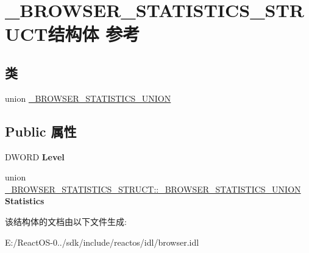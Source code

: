 \hypertarget{struct___b_r_o_w_s_e_r___s_t_a_t_i_s_t_i_c_s___s_t_r_u_c_t}{}\section{\+\_\+\+B\+R\+O\+W\+S\+E\+R\+\_\+\+S\+T\+A\+T\+I\+S\+T\+I\+C\+S\+\_\+\+S\+T\+R\+U\+C\+T结构体 参考}
\label{struct___b_r_o_w_s_e_r___s_t_a_t_i_s_t_i_c_s___s_t_r_u_c_t}
\subsection*{类}
\begin{DoxyCompactItemize}
\item 
union \hyperlink{union___b_r_o_w_s_e_r___s_t_a_t_i_s_t_i_c_s___s_t_r_u_c_t_1_1___b_r_o_w_s_e_r___s_t_a_t_i_s_t_i_c_s___u_n_i_o_n}{\+\_\+\+B\+R\+O\+W\+S\+E\+R\+\_\+\+S\+T\+A\+T\+I\+S\+T\+I\+C\+S\+\_\+\+U\+N\+I\+ON}
\end{DoxyCompactItemize}
\subsection*{Public 属性}
\begin{DoxyCompactItemize}
\item 
\mbox{\label{struct___b_r_o_w_s_e_r___s_t_a_t_i_s_t_i_c_s___s_t_r_u_c_t_a38a144e3b8e7e8a3ff91552517db83f7}} 
D\+W\+O\+RD {\bfseries Level}
\item 
\mbox{\label{struct___b_r_o_w_s_e_r___s_t_a_t_i_s_t_i_c_s___s_t_r_u_c_t_a27ed08bab972dc09064b2a27c2324a45}} 
union \hyperlink{union___b_r_o_w_s_e_r___s_t_a_t_i_s_t_i_c_s___s_t_r_u_c_t_1_1___b_r_o_w_s_e_r___s_t_a_t_i_s_t_i_c_s___u_n_i_o_n}{\+\_\+\+B\+R\+O\+W\+S\+E\+R\+\_\+\+S\+T\+A\+T\+I\+S\+T\+I\+C\+S\+\_\+\+S\+T\+R\+U\+C\+T\+::\+\_\+\+B\+R\+O\+W\+S\+E\+R\+\_\+\+S\+T\+A\+T\+I\+S\+T\+I\+C\+S\+\_\+\+U\+N\+I\+ON} {\bfseries Statistics}
\end{DoxyCompactItemize}


该结构体的文档由以下文件生成\+:\begin{DoxyCompactItemize}
\item 
E\+:/\+React\+O\+S-\/0../sdk/include/reactos/idl/browser.\+idl\end{DoxyCompactItemize}
